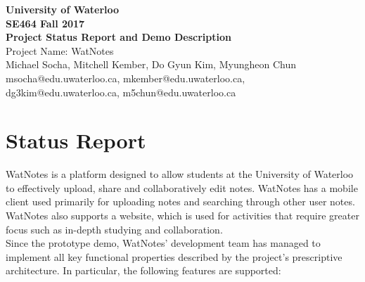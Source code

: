 \documentclass[12pt]{article}
\begin{document}
  \begin{center}
  \vspace*{\fill}
  {\Large\bf University of Waterloo}\\
  \vspace{3mm}
  {\large\bf SE464 Fall 2017}\\
  \vspace{3mm}
  {\Large\bf Project Status Report and Demo Description}\\
  \vspace{5mm}
  {\Large Project Name: WatNotes}\\
  \vspace{5mm}
  Michael Socha, Mitchell Kember, Do Gyun Kim, Myungheon Chun\\
  \vspace{3mm}
  msocha@edu.uwaterloo.ca, mkember@edu.uwaterloo.ca, dg3kim@edu.uwaterloo.ca, m5chun@edu.uwaterloo.ca\\
  \vspace*{\fill}
  \end{center}

  \newpage

  \section{Status Report}
    WatNotes is a platform designed to allow students at the University of Waterloo to effectively upload, share
    and collaboratively edit notes. WatNotes has a mobile client used primarily for uploading notes and searching
    through other user notes. WatNotes also supports a website, which is used for activities that require greater
    focus such as in-depth studying and collaboration. \\

    Since the prototype demo, WatNotes' development team has managed to implement all key functional properties described
    by the project's prescriptive architecture. In particular, the following features are supported:
    
\end{document}
